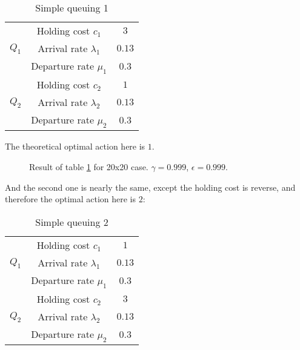 \documentclass[
  a4paper, xcolor = usenames,dvipsnames]{article}
\begin{document}
\begin{table}[ht]
\caption{Simple queuing 1}
\begin{center}
\begin{tabular}{c c c}
    \hline
    \multirow{3}{*}{$Q_{1}$} & Holding cost $c_{1}$ & $3$ \\
    & Arrival rate $\lambda_{1}$ & $0.13$ \\
    & Departure rate $\mu_{1}$ & $0.3$ \\
    \cline{2-3}
    \multirow{3}{*}{$Q_{2}$} & Holding cost $c_{2}$ & $1$ \\
    & Arrival rate $\lambda_{2}$ & $0.13$ \\
    & Departure rate $\mu_{2}$ & $0.3$ \\    
    \hline
\end{tabular}
\end{center}
\label{tab:simple-queuing-1}
\end{table}

The theoretical optimal action here is \(1\).



\begin{figure}

{\centering {}

}

\caption{Result of table \ref{tab:simple-queuing-1} for 20x20 case. \(\gamma = 0.999\), \(\epsilon = 0.999\).}\label{fig:20x20-simple-queuing-1}
\end{figure}

And the second one is nearly the same, except the holding cost is reverse, and therefore the optimal action here is \(2\):

\begin{table}[ht]
\caption{Simple queuing 2}
\begin{center}
\begin{tabular}{c c c}
    \hline
    \multirow{3}{*}{$Q_{1}$} & Holding cost $c_{1}$ & $1$ \\
    & Arrival rate $\lambda_{1}$ & $0.13$ \\
    & Departure rate $\mu_{1}$ & $0.3$ \\
    \cline{2-3}
    \multirow{3}{*}{$Q_{2}$} & Holding cost $c_{2}$ & $3$ \\
    & Arrival rate $\lambda_{2}$ & $0.13$ \\
    & Departure rate $\mu_{2}$ & $0.3$ \\    
    \hline
\end{tabular}
\end{center}
\label{tab:simple-queuing-2}
\end{table}
\end{document}
